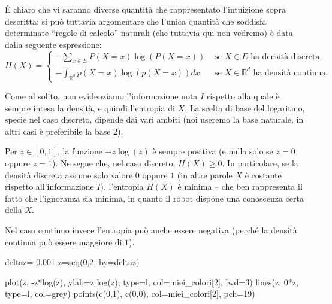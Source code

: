 \documentclass[
  italian,
  letterpaper,
]{book}
\newenvironment{Shaded}{\begin{snugshade}}{\end{snugshade}}
\newcommand{\AttributeTok}[1]{\textcolor[rgb]{0.40,0.45,0.13}{#1}}
\newcommand{\DecValTok}[1]{\textcolor[rgb]{0.68,0.00,0.00}{#1}}
\newcommand{\FloatTok}[1]{\textcolor[rgb]{0.68,0.00,0.00}{#1}}
\newcommand{\FunctionTok}[1]{\textcolor[rgb]{0.28,0.35,0.67}{#1}}
\newcommand{\NormalTok}[1]{\textcolor[rgb]{0.00,0.23,0.31}{#1}}
\newcommand{\OtherTok}[1]{\textcolor[rgb]{0.00,0.23,0.31}{#1}}
\newcommand{\SpecialCharTok}[1]{\textcolor[rgb]{0.37,0.37,0.37}{#1}}
\newcommand{\StringTok}[1]{\textcolor[rgb]{0.13,0.47,0.30}{#1}}
\newcommand{\R}{\mathbb{R}}
\theoremstyle{definition}
\theoremstyle{remark}
\begin{document}
È chiaro che vi saranno diverse quantità che rappresentato l'intuizione
sopra descritta: si può tuttavia argomentare che l'unica quantità che
soddisfa determinate ``regole di calcolo'' naturali (che tuttavia qui
non vedremo) è data dalla seguente espressione:
\[ H(X) = \begin{cases} -\sum_{x \in E} P(X= x) \log( P(X=x)) & \text{ se $X \in E$ ha densità discreta,}\\
 -\int_{\R^d} p(X= x) \log( p(X=x)) d x & \text{ se $X\in \R^d$ ha densità continua.}\end{cases}\]

Come al solito, non evidenziamo l'informazione nota \(I\) rispetto alla
quale è sempre intesa la densità, e quindi l'entropia di \(X\). La
scelta di base del logaritmo, specie nel caso discreto, dipende dai vari
ambiti (noi useremo la base naturale, in altri casi è preferibile la
base \(2\)).

Per \(z \in [0,1]\), la funzione \(-z \log (z)\) è sempre positiva (e
nulla solo se \(z =0\) oppure \(z=1\)). Ne segue che, nel caso discreto,
\(H(X) \ge 0\). In particolare, se la densità discreta assume solo
valore \(0\) oppure \(1\) (in altre parole \(X\) è costante rispetto
all'informazione \(I\)), l'entropia \(H(X)\) è minima -- che ben
rappresenta il fatto che l'ignoranza sia minima, in quanto il robot
dispone una conoscenza certa della \(X\).

Nel caso continuo invece l'entropia può anche essere negativa (perché la
densità continua può essere maggiore di \(1\)).

\begin{Shaded}
\begin{Highlighting}[]
\NormalTok{deltaz}\OtherTok{=} \FloatTok{0.001}
\NormalTok{z}\OtherTok{=}\FunctionTok{seq}\NormalTok{(}\DecValTok{0}\NormalTok{,}\DecValTok{2}\NormalTok{, }\AttributeTok{by=}\NormalTok{deltaz)}


\FunctionTok{plot}\NormalTok{(z, }\SpecialCharTok{{-}}\NormalTok{z}\SpecialCharTok{*}\FunctionTok{log}\NormalTok{(z),  }\AttributeTok{ylab=}\StringTok{\textquotesingle{}{-}z log(z)\textquotesingle{}}\NormalTok{, }\AttributeTok{type=}\StringTok{\textquotesingle{}l\textquotesingle{}}\NormalTok{, }\AttributeTok{col=}\NormalTok{miei\_colori[}\DecValTok{2}\NormalTok{], }\AttributeTok{lwd=}\DecValTok{3}\NormalTok{)}
\FunctionTok{lines}\NormalTok{(z, }\DecValTok{0}\SpecialCharTok{*}\NormalTok{z, }\AttributeTok{type=}\StringTok{\textquotesingle{}l\textquotesingle{}}\NormalTok{, }\AttributeTok{col=}\StringTok{\textquotesingle{}grey\textquotesingle{}}\NormalTok{)}
\FunctionTok{points}\NormalTok{(}\FunctionTok{c}\NormalTok{(}\DecValTok{0}\NormalTok{,}\DecValTok{1}\NormalTok{), }\FunctionTok{c}\NormalTok{(}\DecValTok{0}\NormalTok{,}\DecValTok{0}\NormalTok{), }\AttributeTok{col=}\NormalTok{miei\_colori[}\DecValTok{2}\NormalTok{], }\AttributeTok{pch=}\DecValTok{19}\NormalTok{)}
\end{Highlighting}
\end{Shaded}
\end{document}
